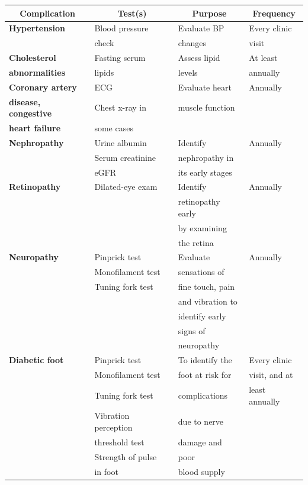 {
\small\addtolength{\tabcolsep}{-5pt}
\begin{longtable}{|l|l|l|l|}
\hline
\multicolumn{1}{|c|}{\textbf{Complication}} & \multicolumn{1}{c|}{\textbf{Test(s)}} & \multicolumn{1}{c|}{\textbf{Purpose}} & \multicolumn{1}{c|}{\textbf{Frequency}}\\
\hline
\textbf{Hypertension} & Blood pressure & Evaluate BP & Every clinic\\
 & check & changes & visit\\
\hline
\textbf{Cholesterol} & Fasting serum & Assess lipid & At least\\
\textbf{abnormalities} & lipids & levels & annually\\
\hline
\textbf{Coronary artery} & ECG & Evaluate heart & Annually\\
\textbf{disease, congestive} & Chest x-ray in & muscle function & \\
\textbf{heart failure} & some cases &  & \\
\hline
\textbf{Nephropathy} & Urine albumin & Identify & Annually\\
 & Serum creatinine & nephropathy in & \\
 & eGFR & its early stages & \\
\hline
\textbf{Retinopathy} & Dilated-eye exam & Identify & Annually\\
 &  & retinopathy early & \\
 &  & by examining & \\
 &  & the retina & \\
\hline
\textbf{Neuropathy} & Pinprick test & Evaluate & Annually\\
 & Monofilament test & sensations of & \\
 & Tuning fork test & fine touch, pain & \\
 &  & and vibration to & \\
 &  & identify early & \\
 &  & signs of & \\
 &  & neuropathy & \\
\hline
\textbf{Diabetic foot} & Pinprick test & To identify the & Every clinic\\
 & Monofilament test & foot at risk for & visit, and at\\
 & Tuning fork test & complications & least annually\\
 & Vibration perception & due to nerve & \\
 & threshold test & damage and & \\
 & Strength of pulse & poor & \\
 & in foot & blood supply & \\
\hline
\end{longtable}
}\relax


